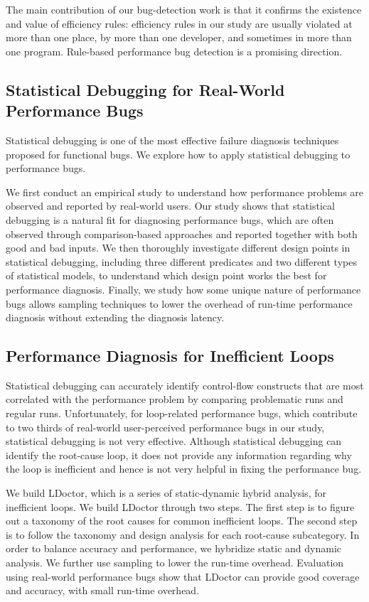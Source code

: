 The main contribution of our bug-detection work is that it 
confirms the existence and value of efficiency rules: 
efficiency rules in our study are usually violated at more than one place, 
by more than one developer, 
and sometimes in more than one program. 
Rule-based performance bug detection is a promising direction. 

\subsection{Statistical Debugging for Real-World Performance Bugs}
Statistical debugging is one of the most effective failure diagnosis techniques proposed for functional bugs. 
We explore how to apply statistical debugging to performance bugs. 

We first conduct an empirical study to understand how performance problems are observed and reported by real-world users. 
Our study shows that statistical debugging is a natural fit for diagnosing performance bugs, 
which are often observed through comparison-based approaches and reported together with both good and bad inputs. 
We then thoroughly investigate different design points in statistical debugging, 
including three different predicates and two different types of statistical models, 
to understand which design point works the best for performance diagnosis. 
Finally, we study how some unique nature of performance bugs allows sampling techniques 
to lower the overhead of run-time performance diagnosis without extending the diagnosis latency. 

\subsection{Performance Diagnosis for Inefficient Loops}
Statistical debugging can accurately identify control-flow constructs 
that are most correlated with the performance problem by comparing problematic runs and regular runs. 
Unfortunately, for loop-related performance bugs, which contribute to
two thirds of real-world user-perceived performance bugs in our study, 
statistical debugging is not very effective.
Although statistical debugging can identify the root-cause loop, it does
not provide any information regarding why the loop is inefficient 
and hence is not very helpful in fixing the performance bug.

We build LDoctor, which is a series of static-dynamic hybrid analysis, for inefficient loops. 
We build LDoctor through two steps. 
The first step is to figure out a taxonomy of the root causes for common inefficient loops. 
The second step is to follow the taxonomy and design analysis for each root-cause subcategory. 
In order to balance accuracy and performance, we hybridize static and dynamic analysis. 
We further use sampling to lower the run-time overhead. 
Evaluation using real-world performance bugs show that LDoctor can provide good coverage and accuracy, 
with small run-time overhead.

